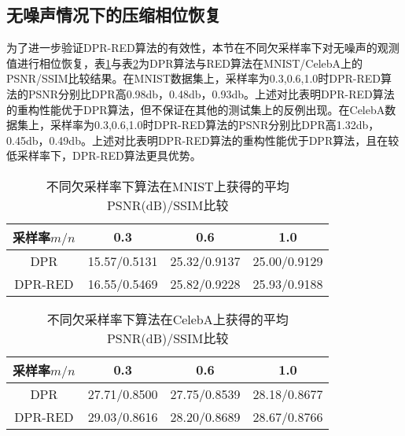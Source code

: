 \subsection{无噪声情况下的压缩相位恢复}
为了进一步验证DPR-RED算法的有效性，本节在不同欠采样率下对无噪声的观测值进行相位恢复，表\ref{table:5-1}与表\ref{table:5-2}为DPR算法与RED算法在MNIST/CelebA上的PSNR/SSIM比较结果。在MNIST数据集上，采样率为0.3,0.6,1.0时DPR-RED算法的PSNR分别比DPR高0.98db，0.48db，0.93db。上述对比表明DPR-RED算法的重构性能优于DPR算法，但不保证在其他的测试集上的反例出现。在CelebA数据集上，采样率为0.3,0.6,1.0时DPR-RED算法的PSNR分别比DPR高1.32db，0.45db，0.49db。上述对比表明DPR-RED算法的重构性能优于DPR算法，且在较低采样率下，DPR-RED算法更具优势。
\begin{table}[!htbp]
	\def\arraystretch{1.4}\centering{}
	\caption{不同欠采样率下算法在MNIST上获得的平均PSNR(dB)/SSIM比较}
	\label{table:5-1}
	\begin{tabular*}{\linewidth}{@{}@{\extracolsep{\fill}}cccc@{}}
		\toprule
		采样率$m/n$   & 0.3 & 0.6 & 1.0\\ %
		\midrule
		DPR           & 15.57/0.5131   & 25.32/0.9137  & 25.00/0.9129 \\
		DPR-RED       & {\color{red}16.55/0.5469}   & {\color{red}25.82/0.9228}  & {\color{red}25.93/0.9188} \\
		\bottomrule
	\end{tabular*}
\end{table}
\begin{table}[!htbp]
	\def\arraystretch{1.4}\centering{}
	\caption{不同欠采样率下算法在CelebA上获得的平均PSNR(dB)/SSIM比较}
	\label{table:5-2}
	\begin{tabular*}{\linewidth}{@{}@{\extracolsep{\fill}}cccc@{}}
		\toprule
		采样率$m/n$    & 0.3 & 0.6 & 1.0 \\ %
		\midrule
		DPR           & 27.71/0.8500   & 27.75/0.8539  & 28.18/0.8677 \\
		DPR-RED       & {\color{red}29.03/0.8616}   & {\color{red}28.20/0.8689}  & {\color{red}28.67/0.8766} \\
		\bottomrule
	\end{tabular*}
\end{table}
